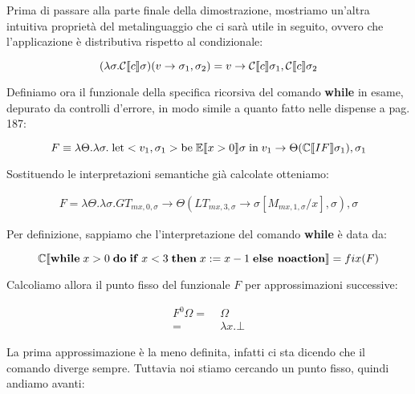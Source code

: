     Prima di passare alla parte finale della dimostrazione, mostriamo un'altra intuitiva proprietà del metalinguaggio che ci sarà utile in seguito, ovvero che l'applicazione è distributiva rispetto al condizionale:
    
    \begin{equation*}
        (\lambda \sigma. \mathcal{C}\llbracket c \rrbracket\sigma)(v \rightarrow \sigma_1, \sigma_2) = v \rightarrow \mathcal{C}\llbracket c \rrbracket\sigma_1, \mathcal{C}\llbracket c \rrbracket\sigma_2
    \end{equation*}
    
    Definiamo ora il funzionale della specifica ricorsiva del comando \textbf{while} in esame, depurato da controlli d'errore, in modo simile a quanto fatto nelle dispense a pag. 187:
    
    \begin{equation*}
        F \equiv \lambda\Theta.\lambda\sigma.\; \mbox{let} <v_1,\sigma_1> \mbox{be}\; \mathbb{E}\llbracket x>0 \rrbracket\sigma\; \mbox{in}\; v_1 \rightarrow \Theta(\mathbb{C}\llbracket IF \rrbracket\sigma_1), \sigma_1
    \end{equation*}
    
    Sostituendo le interpretazioni semantiche già calcolate otteniamo:
    
    \begin{align*}
        F = \lambda\Theta.\lambda\sigma. GT_{mx,0,\sigma} \rightarrow \Theta(LT_{mx,3,\sigma}\rightarrow \sigma[M_{mx,1,\sigma}/x], \sigma), \sigma
    \end{align*}
    
    Per definizione, sappiamo che l'interpretazione del comando \textbf{while} è data da:
    
    \begin{equation*}
        \mathbb{C}\llbracket \mbox{\textbf{while}}\; x>0\; \mbox{\textbf{do}}\; \mbox{\textbf{if}}\; x<3\; \mbox{\textbf{then}}\; x:=x-1\; \mbox{\textbf{else noaction}} \rrbracket = fix(F)
    \end{equation*}
    
    Calcoliamo allora il punto fisso del funzionale $F$ per approssimazioni successive:
    
    \begin{align*}
        F^0\Omega =\;& \Omega\\
        =\;& \lambda x.\bot
    \end{align*}
    
    La prima approssimazione è la meno definita, infatti ci sta dicendo che il comando diverge sempre. Tuttavia noi stiamo cercando un punto fisso, quindi andiamo avanti:
    
